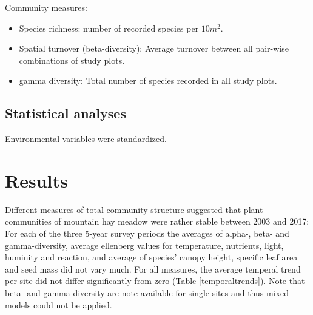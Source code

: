 \documentclass[fleqn,10pt,lineno]{wlpeerj} %
\providecommand{\tightlist}{
\setlength{\itemsep}{0pt}\setlength{\parskip}{0pt}}
\begin{document}
Community measures:

\begin{itemize}
\tightlist
\item
  Species richness: number of recorded species per \(10m^2\).
\item
  Spatial turnover (beta-diversity): Average turnover between all
  pair-wise combinations of study plots.
\item
  gamma diversity: Total number of species recorded in all study plots.
\end{itemize}

\subsection*{Statistical analyses}\label{statistical-analyses}

Environmental variables were standardized.

\section*{Results}\label{results}

Different measures of total community structure suggested that plant
communities of mountain hay meadow were rather stable between 2003 and
2017: For each of the three 5-year survey periods the averages of
alpha-, beta- and gamma-diversity, average ellenberg values for
temperature, nutrients, light, huminity and reaction, and average of
species' canopy height, specific leaf area and seed mass did not vary
much. For all measures, the average temperal trend per site did not
differ significantly from zero (Table \ref{temporaltrends}). Note that
beta- and gamma-diversity are note available for single sites and thus
mixed models could not be applied.
\end{document}
